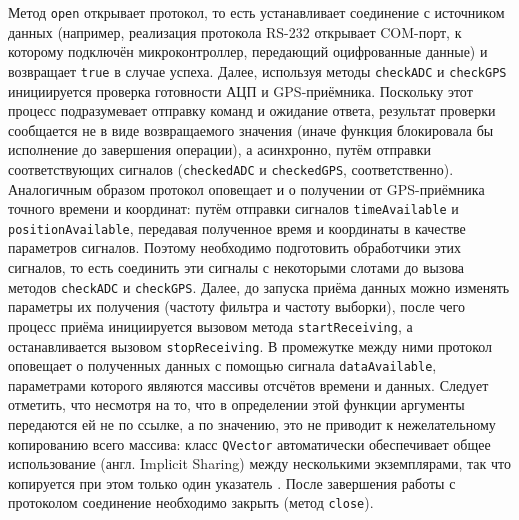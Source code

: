 \documentclass[a4paper, 14pt, titlepage]{extarticle}
\newcommand{\inlinecode}[1]{\lstinline[basicstyle=\ttfamily]{#1}}
\newcommand{\eng}[1]{\foreignlanguage{english}{#1}}
\begin{document}
  Метод \inlinecode{open} открывает протокол, то есть устанавливает соединение с источником данных
  (например, реализация протокола RS-232 открывает COM-порт, к которому подключён
  микроконтроллер, передающий оцифрованные данные) и возвращает \inlinecode{true} в случае успеха.
  Далее, используя методы \inlinecode{checkADC} и \inlinecode{checkGPS} инициируется проверка
  готовности АЦП и GPS-приёмника. Поскольку этот процесс подразумевает отправку команд и ожидание
  ответа, результат проверки сообщается не в виде возвращаемого значения (иначе функция блокировала
  бы исполнение до завершения операции), а асинхронно, путём отправки соответствующих сигналов
  (\inlinecode{checkedADC} и \inlinecode{checkedGPS}, соответственно). Аналогичным образом протокол
  оповещает и о получении от GPS-приёмника точного времени и координат: путём отправки сигналов
  \inlinecode{timeAvailable} и \inlinecode{positionAvailable}, передавая полученное время и
  координаты в качестве параметров сигналов. Поэтому необходимо подготовить
  обработчики этих сигналов, то есть соединить эти сигналы с некоторыми слотами до вызова методов
  \inlinecode{checkADC} и \inlinecode{checkGPS}. Далее, до запуска приёма данных можно изменять
  параметры их получения (частоту фильтра и частоту выборки), после чего процесс приёма инициируется
  вызовом метода \inlinecode{startReceiving}, а останавливается вызовом \inlinecode{stopReceiving}.
  В промежутке между ними протокол оповещает о полученных данных с помощью сигнала
  \inlinecode{dataAvailable}, параметрами которого являются массивы отсчётов времени и данных.
  Следует отметить, что несмотря на то, что в определении этой функции аргументы передаются ей не по
  ссылке, а по значению, это не приводит к нежелательному копированию всего массива: класс
  \inlinecode{QVector} автоматически обеспечивает общее использование (англ. \eng{Implicit Sharing})
  между несколькими экземплярами, так что копируется при этом только один указатель \cite{qt-implicit-sharing}.
  После завершения работы с протоколом соединение необходимо закрыть (метод \inlinecode{close}).

\end{document}

